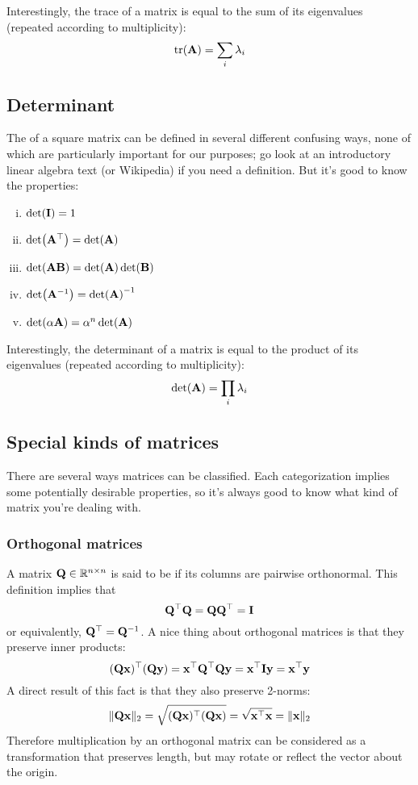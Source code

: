 Interestingly, the trace of a matrix is equal to the sum of its eigenvalues (repeated according to multiplicity):
\[\tr(\mathbf{A}) = \sum_i \lambda_i\]

\subsection{Determinant}
The  of a square matrix can be defined in several different confusing ways, none of which are particularly important for our purposes; go look at an introductory linear algebra text (or Wikipedia) if you need a definition.
But it's good to know the properties:
\begin{enumerate}[(i)]
\item $\det(\mathbf{I}) = 1$
\item $\det(\mathbf{A}^\top) = \det(\mathbf{A})$
\item $\det(\mathbf{A}\mathbf{B}) = \det(\mathbf{A})\det(\mathbf{B})$
\item $\det(\mathbf{A}^{-1}) = \det(\mathbf{A})^{-1}$
\item $\det(\alpha\mathbf{A}) = \alpha^n \det(\mathbf{A})$
\end{enumerate}
Interestingly, the determinant of a matrix is equal to the product of its eigenvalues (repeated according to multiplicity):
\[\det(\mathbf{A}) = \prod_i \lambda_i\]

\subsection{Special kinds of matrices}
There are several ways matrices can be classified.
Each categorization implies some potentially desirable properties, so it's always good to know what kind of matrix you're dealing with.

\subsubsection{Orthogonal matrices}
A matrix $\mathbf{Q} \in \mathbb{R}^{n \times n}$ is said to be  if its columns are pairwise orthonormal.
This definition implies that
\[\mathbf{Q}^\top \mathbf{Q} = \mathbf{Q}\mathbf{Q}^\top = \mathbf{I}\]
or equivalently, $\mathbf{Q}^\top = \mathbf{Q}^{-1}$. A nice thing about orthogonal matrices is that they preserve inner products:
\[(\mathbf{Q}\mathbf{x})^\top(\mathbf{Q}\mathbf{y}) = \mathbf{x}^\top \mathbf{Q}^\top \mathbf{Q}\mathbf{y} = \mathbf{x}^\top \mathbf{I}\mathbf{y} = \mathbf{x}^\top\mathbf{y}\]
A direct result of this fact is that they also preserve 2-norms:
\[\|\mathbf{Q}\mathbf{x}\|_2 = \sqrt{(\mathbf{Q}\mathbf{x})^\top(\mathbf{Q}\mathbf{x})} = \sqrt{\mathbf{x}^\top\mathbf{x}} = \|\mathbf{x}\|_2\]
Therefore multiplication by an orthogonal matrix can be considered as a transformation that preserves length, but may rotate or reflect the vector about the origin.

